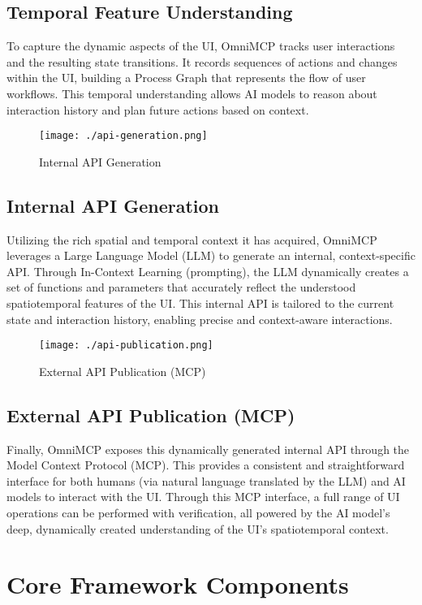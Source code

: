 \documentclass{article}
\begin{document}
\subsection{Temporal Feature Understanding}
To capture the dynamic aspects of the UI, OmniMCP tracks user interactions and the resulting state transitions. It records sequences of actions and changes within the UI, building a Process Graph that represents the flow of user workflows. This temporal understanding allows AI models to reason about interaction history and plan future actions based on context.

\begin{figure}[h]
\centering
\texttt{[image: ./api-generation.png]}
\caption{Internal API Generation}
\label{fig:internal-api}
\end{figure}

\subsection{Internal API Generation}
Utilizing the rich spatial and temporal context it has acquired, OmniMCP leverages a Large Language Model (LLM) to generate an internal, context-specific API. Through In-Context Learning (prompting), the LLM dynamically creates a set of functions and parameters that accurately reflect the understood spatiotemporal features of the UI. This internal API is tailored to the current state and interaction history, enabling precise and context-aware interactions.

\begin{figure}[h]
\centering
\texttt{[image: ./api-publication.png]}
\caption{External API Publication (MCP)}
\label{fig:external-api}
\end{figure}

\subsection{External API Publication (MCP)}
Finally, OmniMCP exposes this dynamically generated internal API through the Model Context Protocol (MCP). This provides a consistent and straightforward interface for both humans (via natural language translated by the LLM) and AI models to interact with the UI. Through this MCP interface, a full range of UI operations can be performed with verification, all powered by the AI model's deep, dynamically created understanding of the UI's spatiotemporal context.

\section{Core Framework Components}
\end{document}
